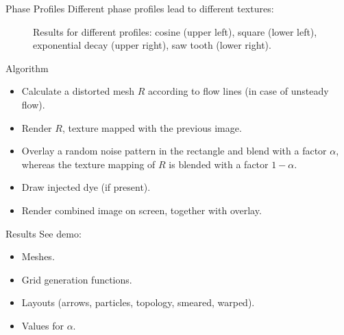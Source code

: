 \documentclass[red]{beamer}
\begin{document}
\begin{frame}{Phase Profiles}
  Different phase profiles lead to different textures:
  \begin{figure}[H]
    \centering
    \caption{Results for different profiles: cosine (upper left), square (lower left), exponential decay (upper right), saw tooth (lower right).}
  \end{figure}
\end{frame}

\begin{frame}{Algorithm}
  \begin{itemize}
  \item 
    Calculate a distorted mesh $R$ according to flow lines (in case of unsteady flow).
  \item
    Render $R$, texture mapped with the previous image.
  \item
    Overlay a random noise pattern in the rectangle and blend with a factor $\alpha$, whereas the texture mapping of $R$ is blended with a factor $1 - \alpha$.
  \item
    Draw injected dye (if present).
  \item
    Render combined image on screen, together with overlay.
  \end{itemize}
\end{frame}


\begin{frame}{Results}
  See demo:
  \begin{itemize}
  \item 
    Meshes.
  \item
    Grid generation functions.
  \item
    Layouts (arrows, particles, topology, smeared, warped).
  \item
    Values for $\alpha$.
  \end{itemize}
\end{frame}
\end{document}
